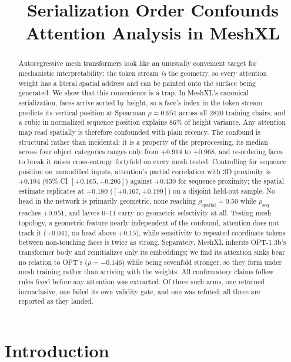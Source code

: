 \documentclass[conference]{IEEEtran}
\title{Serialization Order Confounds Attention Analysis in MeshXL}
\author{\IEEEauthorblockN{Minwoo Choi}
\IEEEauthorblockA{School of Data Science\\
University of Virginia\\
Charlottesville, VA\\
qce2dp@virginia.edu}}
\begin{document}
\maketitle

\begin{abstract}
Autoregressive mesh transformers look like an unusually convenient target for
mechanistic interpretability: the token stream \emph{is} the geometry, so every
attention weight has a literal spatial address and can be painted onto the
surface being generated. We show that this convenience is a trap. In MeshXL's
canonical serialization, faces arrive sorted by height, so a face's index in the
token stream predicts its vertical position at Spearman $\rho = 0.951$ across all
2820 training chairs, and a cubic in normalized sequence position explains 86\%
of height variance. Any attention map read spatially is therefore confounded with
plain recency. The confound is structural rather than incidental: it is a
property of the preprocessing, its median across four object categories ranges
only from $+0.914$ to $+0.968$, and re-ordering faces to break it raises
cross-entropy fortyfold on every mesh tested. Controlling for sequence position
on unmodified inputs, attention's partial correlation with 3D proximity is
$+0.194$ (95\% CI $[+0.165, +0.206]$) against $+0.430$ for sequence proximity;
the spatial estimate replicates at $+0.180$ ($[+0.167, +0.199]$) on a disjoint
held-out sample. No head in the network is primarily geometric, none reaching
$\rho_{\text{spatial}} = 0.50$ while $\rho_{\text{seq}}$ reaches $+0.951$, and
layers 0--11 carry no geometric selectivity at all. Testing mesh topology, a
geometric feature nearly independent of the confound, attention does not track it
($+0.041$, no head above $+0.15$), while sensitivity to repeated coordinate
tokens between non-touching faces is twice as strong. Separately, MeshXL inherits
OPT-1.3b's transformer body and reinitializes only its embeddings; we find its
attention sinks bear no relation to OPT's ($\rho = -0.146$) while being sevenfold
stronger, so they form under mesh training rather than arriving with the weights.
All confirmatory claims follow rules fixed before any attention was extracted.
Of three such arms, one returned inconclusive, one failed its own validity gate,
and one was refuted; all three are reported as they landed.
\end{abstract}

\section{Introduction}
\end{document}
